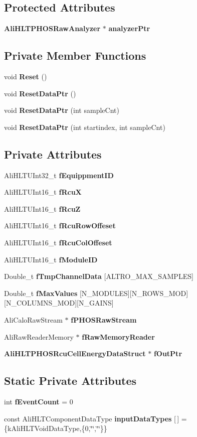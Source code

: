 \subsection*{Protected Attributes}
\begin{CompactItemize}
\item 
{\bf Ali\-HLTPHOSRaw\-Analyzer} $\ast$ {\bf analyzer\-Ptr}
\end{CompactItemize}
\subsection*{Private Member Functions}
\begin{CompactItemize}
\item 
void {\bf Reset} ()
\item 
void {\bf Reset\-Data\-Ptr} ()
\item 
void {\bf Reset\-Data\-Ptr} (int sample\-Cnt)
\item 
void {\bf Reset\-Data\-Ptr} (int startindex, int sample\-Cnt)
\end{CompactItemize}
\subsection*{Private Attributes}
\begin{CompactItemize}
\item 
Ali\-HLTUInt32\_\-t {\bf f\-Equippment\-ID}
\item 
Ali\-HLTUInt16\_\-t {\bf f\-Rcu\-X}
\item 
Ali\-HLTUInt16\_\-t {\bf f\-Rcu\-Z}
\item 
Ali\-HLTUInt16\_\-t {\bf f\-Rcu\-Row\-Offeset}
\item 
Ali\-HLTUInt16\_\-t {\bf f\-Rcu\-Col\-Offeset}
\item 
Ali\-HLTUInt16\_\-t {\bf f\-Module\-ID}
\item 
Double\_\-t {\bf f\-Tmp\-Channel\-Data} [ALTRO\_\-MAX\_\-SAMPLES]
\item 
Double\_\-t {\bf f\-Max\-Values} [N\_\-MODULES][N\_\-ROWS\_\-MOD][N\_\-COLUMNS\_\-MOD][N\_\-GAINS]
\item 
Ali\-Calo\-Raw\-Stream $\ast$ {\bf f\-PHOSRaw\-Stream}
\item 
Ali\-Raw\-Reader\-Memory $\ast$ {\bf f\-Raw\-Memory\-Reader}
\item 
{\bf Ali\-HLTPHOSRcu\-Cell\-Energy\-Data\-Struct} $\ast$ {\bf f\-Out\-Ptr}
\end{CompactItemize}
\subsection*{Static Private Attributes}
\begin{CompactItemize}
\item 
int {\bf f\-Event\-Count} = 0
\item 
const Ali\-HLTComponent\-Data\-Type {\bf input\-Data\-Types} [$\,$] = \{k\-Ali\-HLTVoid\-Data\-Type,\{0,\char`\"{}\char`\"{},\char`\"{}\char`\"{}\}\}
\end{CompactItemize}



